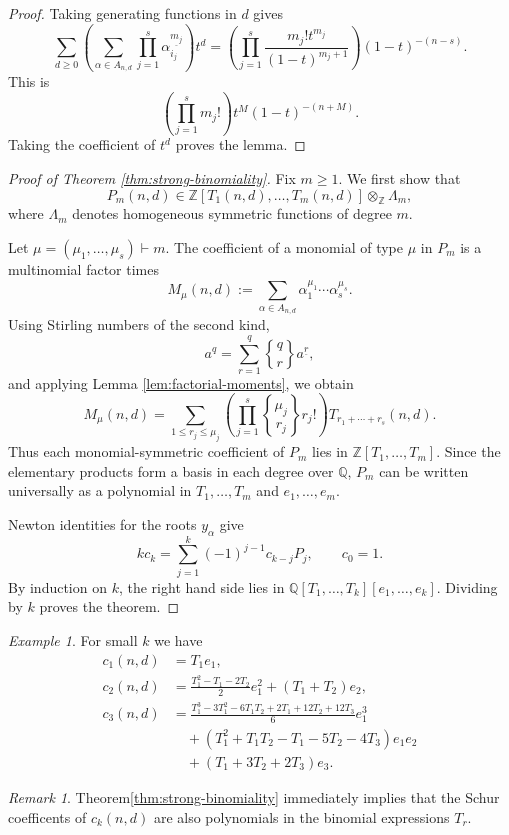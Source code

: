 \documentclass[11pt]{amsart}
\numberwithin{equation}{section}
\theoremstyle{remark}
\newtheorem{remark}[theorem]{Remark}
\newtheorem{example}[theorem]{Example}
\newcommand{\Q}{\mathbb Q}
\newcommand{\Z}{\mathbb Z}
\newcommand{\StirTwo}[2]{\genfrac{\{} {\}}{0pt}{}{#1}{#2}}
\begin{document}
\begin{proof}
Taking generating functions in $d$ gives
\[
  \sum_{d\ge0}\left(\sum_{\alpha\in A_{n,d}}\prod_{j=1}^s \alpha_{i_j}^{\underline {m_j}}\right)t^d
  =
  \left(\prod_{j=1}^s\frac{m_j!t^{m_j}}{(1-t)^{m_j+1}}\right)(1-t)^{-(n-s)}.
\]
This is
\[
  \left(\prod_{j=1}^s m_j!\right)t^M(1-t)^{-(n+M)}.
\]
Taking the coefficient of $t^d$ proves the lemma.
\end{proof}

\begin{proof}[Proof of Theorem \ref{thm:strong-binomiality}]
Fix $m\ge1$.  We first show that
\begin{equation}\label{eq:P-m-in-ring}
  P_m(n,d)\in \Z[T_1(n,d),\ldots,T_m(n,d)]\otimes_{\Z}\Lambda_m,
\end{equation}
where $\Lambda_m$ denotes homogeneous symmetric functions of degree $m$.

Let $\mu=(\mu_1,\ldots,\mu_s)\vdash m$.  The coefficient of a monomial of type $\mu$ in $P_m$ is a multinomial factor times
\[
  M_\mu(n,d):=\sum_{\alpha\in A_{n,d}}\alpha_1^{\mu_1}\cdots\alpha_s^{\mu_s}.
\]
Using Stirling numbers of the second kind,
\[
  a^q=\sum_{r=1}^{q}\StirTwo{q}{r}a^{\underline r},
\]
and applying Lemma \ref{lem:factorial-moments}, we obtain
\begin{equation}\label{eq:mixed-moment}
  M_\mu(n,d)=
  \sum_{1\le r_j\le \mu_j}
  \left(\prod_{j=1}^s \StirTwo{\mu_j}{r_j}r_j!\right)
  T_{r_1+\cdots+r_s}(n,d).
\end{equation}
Thus each monomial-symmetric coefficient of $P_m$ lies in $\Z[T_1,\ldots,T_m]$.  Since the elementary products form a basis in each degree over $\Q$, $P_m$ can be written universally as a polynomial in $T_1,\ldots,T_m$ and $e_1,\ldots,e_m$.

Newton identities for the roots $y_\alpha$ give
\[
  k c_k=\sum_{j=1}^{k}(-1)^{j-1}c_{k-j}P_j,\qquad c_0=1.
\]
By induction on $k$, the right hand side lies in $\Q[T_1,\ldots,T_k][e_1,\ldots,e_k]$.  Dividing by $k$ proves the theorem.
\end{proof}
\begin{example} \label{ex:small-k-cknd} For small $k$ we have
\[\begin{aligned}
c_1(n,d)&=T_1e_1,\\[3pt]
c_2(n,d)&=
\frac{T_1^2-T_1-2T_2}{2}e_{1}^2
+(T_1+T_2)e_2,\\[3pt]
c_3(n,d)&=
\frac{T_1^3-3T_1^2-6T_1T_2+2T_1+12T_2+12T_3}{6}e_{1}^3\\
&\quad+
\left(T_1^2+T_1T_2-T_1-5T_2-4T_3\right)e_1e_2\\
&\quad+
\left(T_1+3T_2+2T_3\right)e_3.
\end{aligned}\]
\end{example}
\medskip
\begin{remark} \label{strong-binom4schur}
Theorem\ref{thm:strong-binomiality} immediately implies that the Schur coefficents of $c_k(n,d)$ are also polynomials in the binomial expressions $T_r$.
\end{remark}
\end{document}
